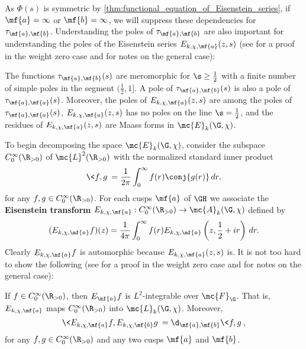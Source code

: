     As $\Phi(s)$ is symmetric by \cref{thm:functional_equation_of_Eisenstein_series}, if $\mf{a} = \infty$ or $\mf{b} = \infty$, we will suppress these dependencies for $\tau_{\mf{a},\mf{b}}$. Understanding the poles of $\tau_{\mf{a},\mf{b}}$ are also important for understanding the poles of the Eisenstein series $E_{k,\chi,\mf{a}}(z,s)$ (see \cite{iwaniec2002spectral} for a proof in the weight zero case and \cite{duke2002subconvexity} for notes on the general case):

    \begin{theorem}\label{thm:residues_of_Eisenstein_series}
      The functions $\tau_{\mf{a},\mf{b}}(s)$ are meromorphic for $\s \ge \frac{1}{2}$ with a finite number of simple poles in the segment $(\frac{1}{2},1]$. A pole of $\tau_{\mf{a},\mf{b}}(s)$ is also a pole of $\tau_{\mf{a},\mf{a}}(s)$. Moreover, the poles of $E_{k,\chi,\mf{a}}(z,s)$ are among the poles of $\tau_{\mf{a},\mf{a}}(s)$, $E_{k,\chi,\mf{a}}(z,s)$ has no poles on the line $\s = \frac{1}{2}$, and the residues of $E_{k,\chi,\mf{a}}(z,s)$ are Maass forms in $\mc{E}_{k}(\G,\chi)$.
    \end{theorem}

    To begin decomposing the space $\mc{E}_{k}(\G,\chi)$, consider the subspace $C_{0}^{\infty}(\R_{> 0})$ of $\mc{L}^{2}(\R_{> 0})$ with the normalized standard inner product
    \[
      \<f,g\> = \frac{1}{2\pi}\int_{0}^{\infty}f(r)\conj{g(r)}\,dr,
    \]
    for any $f,g \in C_{0}^{\infty}(\R_{> 0})$. For each cusps $\mf{a}$ of $\GH$ we associate the \textbf{Eisenstein transform} $E_{k,\chi,\mf{a}}:C_{0}^{\infty}(\R_{> 0}) \to \mc{A}_{k}(\G,\chi)$ defined by
    \[
      (E_{k,\chi,\mf{a}}f)(z) = \frac{1}{4\pi}\int_{0}^{\infty}f(r)E_{k,\chi,\mf{a}}\left(z,\frac{1}{2}+ir\right)\,dr.
    \]
    Clearly $E_{k,\chi,\mf{a}}f$ is automorphic because $E_{k,\chi,\mf{a}}(z,s)$ is. It is not too hard to show the following (see \cite{iwaniec2002spectral} for a proof in the weight zero case and \cite{duke2002subconvexity} for notes on the general case):

    \begin{proposition}\label{prop:Eisenstein_transform_property}
      If $f \in C_{0}^{\infty}(\R_{> 0})$, then $E_{\mf{a}}f$ is $L^{2}$-integrable over $\mc{F}_{\G}$. That is, $E_{k,\chi,\mf{a}}$ maps $C_{0}^{\infty}(\R_{> 0})$ into $\mc{L}_{k}(\G,\chi)$. Moreover,
      \[
        \<E_{k,\chi,\mf{a}}f,E_{k,\chi,\mf{b}}g\> = \d_{\mf{a},\mf{b}}\<f,g\>,
      \]
      for any $f,g \in C_{0}^{\infty}(\R_{> 0})$ and any two cusps $\mf{a}$ and $\mf{b}$.
    \end{proposition}

